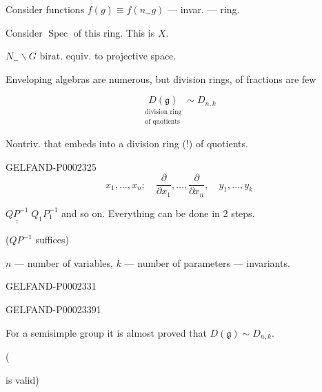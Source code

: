 Consider functions $f (g)\equiv f (n_-g)$ — invar. — ring.



Consider $\operatorname{Spec}$ of this ring. This is $X$.



$N_-\backslash G$ birat. equiv. to projective space.



Enveloping algebras are numerous, but division rings, of fractions are few



\begin{equation*}
 \underset{\substack{\text{division ring}\\\text{of quotients}}}{D (\mathfrak g)}\sim D_{n, k}
\end{equation*}



Nontriv. that embeds into a division ring (!) of quotients.



\begin{GelfandAdjacentEvidence}{GELFAND-P000232}{5}
\begin{equation*}
 x_1,\ldots, x_n;\quad
 \frac{\partial}{\partial x_1},\ldots,\frac{\partial}{\partial x_n},\quad
 y_1,\ldots, y_k
\end{equation*}



\end{GelfandAdjacentEvidence}


$\underline{\underline{QP^{-1}}}\; Q_1P_1^{-1}$ and so on. Everything can be done in 2 steps.

($QP^{-1}$ suffices)



$n$ — number of variables, $k$ — number of parameters — invariants.





\begin{GelfandAdjacentEvidence}{GELFAND-P000233}{1}




\end{GelfandAdjacentEvidence}\begin{GelfandAdjacentEvidence}{GELFAND-P000233}{91}


For a semisimple group it is almost proved that $D (\mathfrak g)\sim D_{n, k}$.




(

 is valid)

\end{GelfandAdjacentEvidence}

